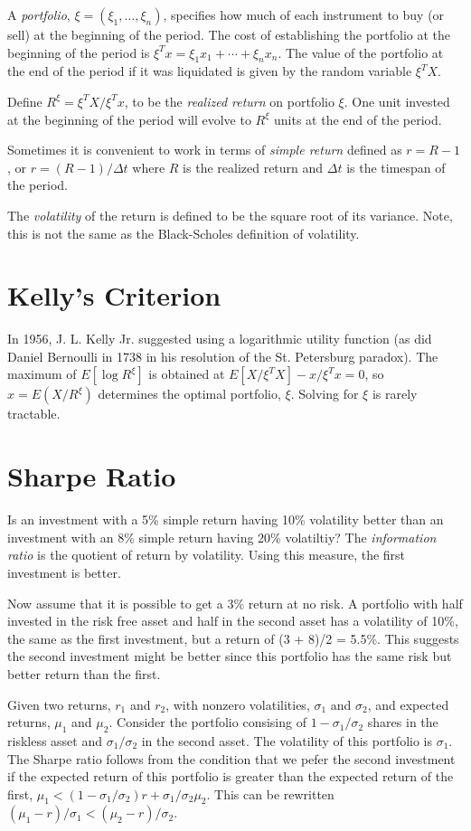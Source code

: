 \documentclass[11pt,fleqn]{amsart}
\begin{document}
A {\em portfolio}, $\xi = (\xi_1,\dots,\xi_n)$, specifies how much of each
instrument to buy (or sell) at the beginning of the period. The cost of
establishing the portfolio at the beginning of the period is $\xi^T x =
\xi_1 x_1 + \cdots + \xi_n x_n$. The value of the portfolio at the end of
the period if it was liquidated is given by the random variable $\xi^T X$.

Define $R^\xi = \xi^T X/\xi^T x$, to be the {\em realized return} on
portfolio $\xi$. One unit invested at the beginning of the period will
evolve to $R^\xi$ units at the end of the period.

Sometimes it is convenient to work in terms of {\em simple return}
defined as $r = R - 1$, or $r = (R - 1)/\Delta t$ where $R$ is the
realized return and $\Delta t$ is the timespan of the period.

The {\em volatility} of the return is defined to be the square root of
its variance. Note, this is not the same as the Black-Scholes definition
of volatility.

\section{Kelly's Criterion}
In 1956, J. L. Kelly Jr. suggested using a logarithmic utility function
(as did Daniel Bernoulli in 1738 in his resolution of the St. Petersburg
paradox). The maximum of $E[\log R^\xi]$ is obtained at $E[X/\xi^TX]
- x/\xi^Tx = 0$, so $x = E(X/R^\xi)$ determines the optimal portfolio,
$\xi$. Solving for $\xi$ is rarely tractable.

\section{Sharpe Ratio}
Is an investment with a 5\% simple return having 10\% volatility better
than an investment with an 8\% simple return having 20\% volatiltiy? The
{\em information ratio} is the quotient of return by volatility.
Using this measure, the first investment is better.

Now assume that it is possible to get a 3\% return at no risk. A portfolio
with half invested in the risk free asset and half in the second asset has
a volatility of 10\%, the same as the first investment, but a return of
(3 + 8)/2 = 5.5\%. This suggests the second investment might be better
since this portfolio has the same risk but better return than the first.

Given two returns, $r_1$ and $r_2$, with nonzero volatilities, $\sigma_1$
and $\sigma_2$, and expected returns, $\mu_1$ and $\mu_2$. Consider the
portfolio consising of $1 - \sigma_1/\sigma_2$ shares in the riskless
asset and $\sigma_1/\sigma_2$ in the second asset. The volatility
of this portfolio is $\sigma_1$. The Sharpe ratio follows from the
condition that we pefer the second investment if the expected return
of this portfolio is greater than the expected return of the first,
$\mu_1 < (1 - \sigma_1/\sigma_2)r + \sigma_1/\sigma_2 \mu_2$.  This can
be rewritten $(\mu_1 - r)/\sigma_1 < (\mu_2 - r)/\sigma_2$.
\end{document}
